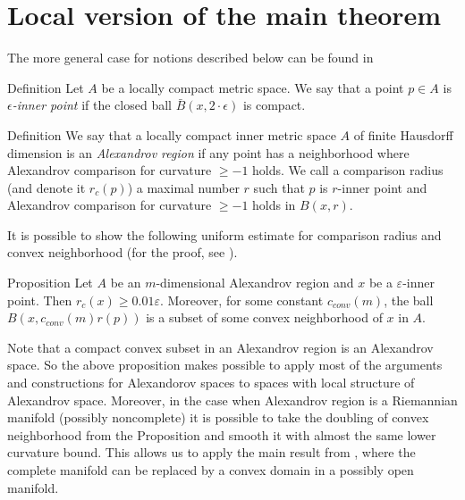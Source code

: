 \section{Local version of the main theorem}\label{sec:local}

The more general case for
notions described below can be found in
\cite{LNep}

\begin{rdef}{Definition}
Let $A$ be a locally compact metric space. 
We say that a point  $p\in A$
is  \emph{ $\epsilon$-inner point} if
the closed ball $\bar B(x,2\cdot\epsilon)$ is compact.

\end{rdef}

\begin{rdef}{Definition}
We say that
 a locally compact inner metric space $A$ of finite Hausdorff dimension
is an \emph{ Alexandrov region} if
any point has a neighborhood where Alexandrov
comparison for curvature $\ge -1$ holds.
We call a comparison 
radius (and denote it $r_c(p)$) a maximal number $r$ such that
$p$ is $r$-inner point and 
 Alexandrov
comparison for curvature $\ge -1$ holds in
$B(x,r)$.


\end{rdef}
It is possible to show the following uniform estimate for
comparison radius and convex neighborhood (for the proof, see \cite{LNep}).

\begin{thm}{Proposition}
Let $A$ be an $m$-dimensional Alexandrov region
and $x$ be a $\varepsilon$-inner
point. Then 
 $r_c(x)\ge 0.01\varepsilon$.
Moreover,  for some constant $c_{conv}(m)$,
the ball $B(x, c_{conv}(m)r(p))$ is a subset of some
convex
neighborhood of $x$ in $A$.

\end{thm}

Note that a compact convex subset in an Alexandrov region is an Alexandrov space.
So the above proposition
makes possible 
to apply most of the arguments and constructions for Alexandorov spaces to
spaces
  with local structure of Alexandrov space. 
  Moreover, in the case when Alexandrov region
  is a Riemannian 
manifold (possibly noncomplete) it is possible
to take the doubling of convex neighborhood from the Proposition
and smooth it with almost the same lower curvature bound.
This allows us to apply the main result from
 \cite{petrunin-SC}, where the complete manifold can be replaced by a convex domain  in a possibly open manifold. 

